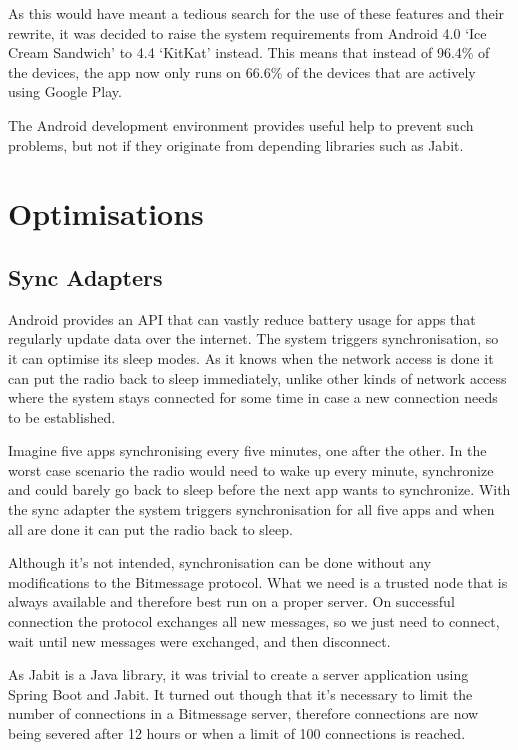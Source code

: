 \documentclass{bfh}
\begin{document}
  As this would have meant a tedious search for the use of these features and their rewrite, it was decided to raise the system requirements from Android 4.0 `Ice Cream Sandwich' to 4.4 `KitKat' instead. This means that instead of 96.4\% of the devices, the app now only runs on 66.6\% of the devices that are actively using Google Play\texttrademark{}.\cite{da:dashboards}

  The Android development environment provides useful help to prevent such problems, but not if they originate from depending libraries such as Jabit.


  \newpage
  \section{Optimisations}
  \subsection{Sync Adapters}
  Android provides an API that can vastly reduce battery usage for apps that regularly update data over the internet. The system triggers synchronisation, so it can optimise its sleep modes. As it knows when the network access is done it can put the radio back to sleep immediately, unlike other kinds of network access where the system stays connected for some time in case a new connection needs to be established.

  Imagine five apps synchronising every five minutes, one after the other. In the worst case scenario the radio would need to wake up every minute, synchronize and could barely go back to sleep before the next app wants to synchronize. With the sync adapter the system triggers synchronisation for all five apps and when all are done it can put the radio back to sleep.

  Although it's not intended, synchronisation can be done without any modifications to the Bitmessage protocol. What we need is a trusted node that is always available and therefore best run on a proper server. On successful connection the protocol exchanges all new messages, so we just need to connect, wait until new messages were exchanged, and then disconnect.

  As Jabit is a Java library, it was trivial to create a server application using Spring Boot and Jabit. It turned out though that it's necessary to limit the number of connections in a Bitmessage server, therefore connections are now being severed after 12 hours or when a limit of 100 connections is reached.
\end{document}
